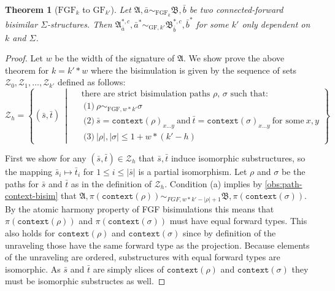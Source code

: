 \documentclass[draft]{scrartcl}
\newtheorem{theorem}{Theorem}
\theoremstyle{definition}
\newcommand{\context}[1]{\mathtt{context}(#1)}
\begin{document}
\begin{theorem}[$\textrm{FGF}_{k}$ to $\textrm{GF}_{k'}$]
  Let $\mathfrak{A}, \bar{a} \sim_{\textrm{FGF}_{k}}\mathfrak{B}, \bar{b}$ be two connected-forward bisimilar $\Sigma$-structures.
  Then $\mathfrak{A}^{*,c}_{\bar{a}}, \bar{a}^{*} \sim_{\textrm{GF},k'} \mathfrak{B}^{*,c}_{\bar{b}}, \bar{b}^{*}$ for some $k'$ only dependent on $k$ and $\Sigma$.
\end{theorem}

\begin{proof}
  Let $w$ be the width of the signature of $\mathfrak{A}$.
  We show prove the above theorem for $k = k' * w$ where the bisimulation is given by the sequence of sets $\mathcal{Z}_{0}, \mathcal{Z}_{1}, \ldots, \mathcal{Z}_{k'}$ defined as follows:
  \begin{equation*}
    \mathcal{Z}_{h} = \left\{
      (\bar{s}, \bar{t})
      \ \middle|\
      \begin{aligned}
        & \text{there are strict bisimulation paths $\rho$, $\sigma$ such that:} \\
        & \ \text{(1)}\ \rho \sim_{\textrm{FGF}, w*k'} \sigma \\
        & \ \text{(2)}\ \bar{s} = \context{\rho}_{x\ldots{}y}\ \text{and}\ \bar{t} = \context{\sigma}_{x\ldots{}y}\ \text{for some}\ x, y \\
        & \ \text{(3)}\ |\rho|, |\sigma| \le 1 + w * (k' - h)
      \end{aligned}
    \right\}
  \end{equation*}

  First we show for any $(\bar{s}, \bar{t}) \in \mathcal{Z}_{h}$ that $\bar{s}, \bar{t}$ induce isomorphic substructures, so the mapping $\bar{s}_{i} \mapsto \bar{t}_{i}$ for $1 \le i \le |\bar{s}|$ is a partial isomorphism.
  Let $\rho$ and $\sigma$ be the paths for $\bar{s}$ and $\bar{t}$ as in the definition of $\mathcal{Z}_{h}$.
  Condition (a) implies by \cref{obs:path-context-bisim} that $\mathfrak{A}, \pi(\context{\rho}) \sim_{FGF,w*k'-|\rho|+1} \mathfrak{B}, \pi(\context{\sigma})$.
  By the atomic harmony property of FGF bisimulations this means that $\pi(\context{\rho})$ and $\pi(\context{\sigma})$ must have equal forward types.
  This also holds for $\context{\rho}$ and $\context{\sigma}$ since by definition of the unraveling those have the same forward type as the projection.
  Because elements of the unraveling are ordered, substructures with equal forward types are isomorphic.
  As $\bar{s}$ and $\bar{t}$ are simply slices of $\context{\rho}$ and $\context{\sigma}$ they must be isomorphic substructes as well.


\end{proof}
\end{document}
